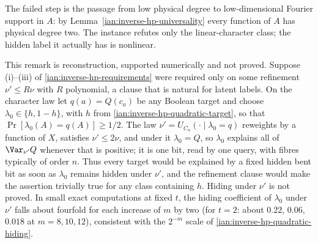 The failed step is the passage from low physical degree to low-dimensional Fourier support in \(A\): by Lemma~\ref{ian:inverse-hp-universality} every function of \(A\) has physical degree two. The instance refutes only the linear-character class; the hidden label it actually has is nonlinear.

\begin{remark}
\label{ian:inverse-hp-refinement-degenerate}
This remark is reconstruction, supported numerically and not proved. Suppose (i)--(iii) of \eqref{ian:inverse-hp-requirements} were required only on some refinement \(\nu'\le R\nu\) with \(R\) polynomial, a clause that is natural for latent labels. On the character law let \(q(a)=Q(c_a)\) be any Boolean target and choose \(\lambda_0\in\{h,1-h\}\), with \(h\) from \eqref{ian:inverse-hp-quadratic-target}, so that \(\Pr[\lambda_0(A)=q(A)]\ge1/2\). The law \(\nu'=U_{C_n}(\cdot\mid\lambda_0=q)\) reweights by a function of \(X\), satisfies \(\nu'\le2\nu\), and under it \(\lambda_0=Q\), so \(\lambda_0\) explains all of \(\Var_{\nu'}Q\) whenever that is positive; it is one bit, read by one query, with fibres typically of order \(n\). Thus every target would be explained by a fixed hidden bent bit as soon as \(\lambda_0\) remains hidden under \(\nu'\), and the refinement clause would make the assertion trivially true for any class containing \(h\). Hiding under \(\nu'\) is not proved. In small exact computations at fixed \(t\), the hiding coefficient of \(\lambda_0\) under \(\nu'\) falls about fourfold for each increase of \(m\) by two (for \(t=2\): about \(0.22\), \(0.06\), \(0.018\) at \(m=8,10,12\)), consistent with the \(2^{-m}\) scale of \eqref{ian:inverse-hp-quadratic-hiding}.
\end{remark}

